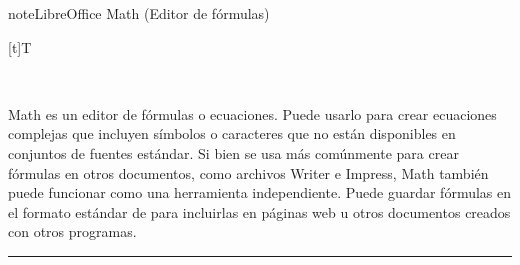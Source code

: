 \documentclass[letterpaper,10pt,spanish]{sphinxmanual}
\let\sphinxpxdimen\pdfpxdimen\else\newdimen\sphinxpxdimen
\begin{document}
\begin{sphinxadmonition}{note}{LibreOffice Math (Editor de fórmulas)}


\begin{savenotes}\sphinxattablestart
\sphinxthistablewithglobalstyle
\centering
\begin{tabulary}{\linewidth}[t]{T}
\sphinxtoprule
\sphinxtableatstartofbodyhook

\begin{sphinxfigure-in-table}
\centering
\capstart
\noindent\sphinxincludegraphics[width=240\sphinxpxdimen]{{image18}.png}
\label{\detokenize{1_guias/10ofimatica/G1012:id58}}\end{sphinxfigure-in-table}\relax
\\
\sphinxbottomrule
\end{tabulary}
\sphinxtableafterendhook\par
\sphinxattableend\end{savenotes}

\sphinxAtStartPar
Math es un editor de fórmulas o ecuaciones. Puede usarlo para crear ecuaciones complejas que incluyen símbolos o caracteres que no están disponibles en conjuntos de fuentes estándar. Si bien se usa más comúnmente para crear fórmulas en otros documentos, como archivos Writer e Impress, Math también puede funcionar como una herramienta independiente. Puede guardar fórmulas en el formato estándar de  para incluirlas en páginas web u otros documentos creados con otros programas.
\end{sphinxadmonition}


\bigskip\hrule\bigskip
\end{document}
